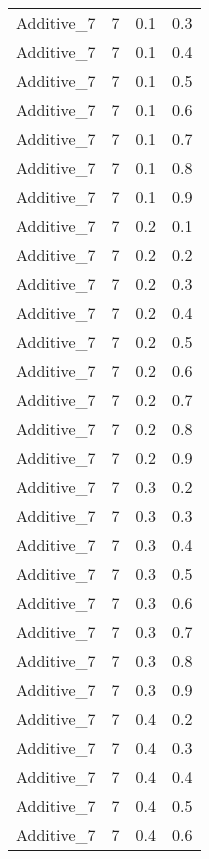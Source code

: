 \documentclass{article}
\begin{document}
\begin{longtable}[H]{lrrr}
 Additive\_7 &       7 &   0.1 &            0.3 \\
 Additive\_7 &       7 &   0.1 &            0.4 \\
 Additive\_7 &       7 &   0.1 &            0.5 \\
 Additive\_7 &       7 &   0.1 &            0.6 \\
 Additive\_7 &       7 &   0.1 &            0.7 \\
 Additive\_7 &       7 &   0.1 &            0.8 \\
 Additive\_7 &       7 &   0.1 &            0.9 \\
 Additive\_7 &       7 &   0.2 &            0.1 \\
 Additive\_7 &       7 &   0.2 &            0.2 \\
 Additive\_7 &       7 &   0.2 &            0.3 \\
 Additive\_7 &       7 &   0.2 &            0.4 \\
 Additive\_7 &       7 &   0.2 &            0.5 \\
 Additive\_7 &       7 &   0.2 &            0.6 \\
 Additive\_7 &       7 &   0.2 &            0.7 \\
 Additive\_7 &       7 &   0.2 &            0.8 \\
 Additive\_7 &       7 &   0.2 &            0.9 \\
 Additive\_7 &       7 &   0.3 &            0.2 \\
 Additive\_7 &       7 &   0.3 &            0.3 \\
 Additive\_7 &       7 &   0.3 &            0.4 \\
 Additive\_7 &       7 &   0.3 &            0.5 \\
 Additive\_7 &       7 &   0.3 &            0.6 \\
 Additive\_7 &       7 &   0.3 &            0.7 \\
 Additive\_7 &       7 &   0.3 &            0.8 \\
 Additive\_7 &       7 &   0.3 &            0.9 \\
 Additive\_7 &       7 &   0.4 &            0.2 \\
 Additive\_7 &       7 &   0.4 &            0.3 \\
 Additive\_7 &       7 &   0.4 &            0.4 \\
 Additive\_7 &       7 &   0.4 &            0.5 \\
 Additive\_7 &       7 &   0.4 &            0.6 \\

\end{longtable}
\end{document}
